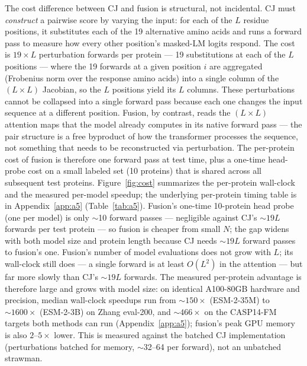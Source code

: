 \documentclass{article}
\begin{document}
The cost difference between CJ and fusion is structural, not
incidental. CJ must \emph{construct} a pairwise score by varying the
input: for each of the $L$ residue positions, it substitutes each of
the 19 alternative amino acids and runs a forward pass to measure how
every other position's masked-LM logits respond. The cost is
$19 \times L$ perturbation forwards per protein --- 19 substitutions at
each of the $L$ positions --- where the 19 forwards at a given position
$i$ are aggregated (Frobenius norm over the response amino acids) into a
single column of the $(L \times L)$ Jacobian, so the $L$ positions yield
its $L$ columns. These perturbations cannot be
collapsed into a single forward pass because each one changes the
input sequence at a different position. Fusion, by contrast, reads
the $(L \times L)$ attention maps that the model already computes in
its native forward pass --- the pair structure is a free
byproduct of how the transformer processes the sequence, not
something that needs to be reconstructed via perturbation. The
per-protein cost of fusion is therefore one forward pass at test
time, plus a one-time head-probe cost on a small labeled set (10
proteins) that is shared across all subsequent test proteins.
Figure~\ref{fig:cost} summarizes the per-protein wall-clock and the
measured per-model speedup; the underlying per-protein timing table is in
Appendix~\ref{app:a5} (Table~\ref{tab:a5}). Fusion's one-time
10-protein head probe (one per model) is only $\sim$10 forward passes --- negligible
against CJ's $\sim 19L$ forwards per test protein --- so fusion is
cheaper from small $N$; the gap widens
with both
model size and protein length because CJ needs $\sim 19L$ forward
passes to fusion's one. Fusion's number of model evaluations does
not grow with $L$; its wall-clock still does --- a single forward is at
least $O(L^2)$ in the attention --- but far more slowly than CJ's
$\sim 19L$ forwards. The measured per-protein advantage is therefore
large and grows with model size: on identical A100-80GB hardware and
precision, median wall-clock speedups run from $\sim 150\times$
(ESM-2-35M) to $\sim 1600\times$ (ESM-2-3B) on Zhang eval-200, and
$\sim 466\times$ on the CASP14-FM targets both methods can
run (Appendix~\ref{app:a5}); fusion's peak GPU memory is also
$2$--$5\times$ lower. This is measured against the batched CJ
implementation (perturbations batched for memory, $\sim$32--64 per
forward), not an unbatched strawman.
\end{document}
